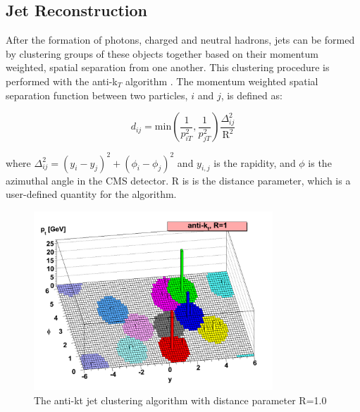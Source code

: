 \subsection{Jet Reconstruction}
\label{jet_reco_overview}

\par After the formation of photons, charged and neutral hadrons, jets
can be formed by clustering groups of these objects together based on
their momentum weighted, spatial separation from one another.  This
clustering procedure is performed with the anti-k$_{T}$ algorithm
\cite{Cacciari:2008gp}.   The momentum weighted spatial separation
function between two particles, $i$ and $j$, is defined as:

\begin{equation}\label{eq:antiKt_d}
d_{ij} = \text{min}(\frac{1}{p_{iT}^{2}},
\frac{1}{p_{jT}^{2}})\frac{\Delta_{ij}^{2}}{\text{R}^{2}}
\end{equation}

\noindent where $\Delta_{ij}^{2} =
(y_{i}-y_{j})^{2}+(\phi_{i}-\phi_{j})^{2}$ and $y_{i,j}$ is the
rapidity, and $\phi$ is the azimuthal angle in the CMS detector.  R is
is the distance parameter, which is a user-defined quantity for the
algorithm.  

\begin{figure}[h]
   \centering
  \includegraphics[width=0.8\textwidth]{Figures/Reconstruction_Diagrams/Jets__AntiKt_Algo.pdf}
  \caption{The anti-kt jet clustering algorithm with distance
    parameter R=1.0 \cite{Cacciari:2008gp}} \label{fig:antiKt}
\end{figure}

